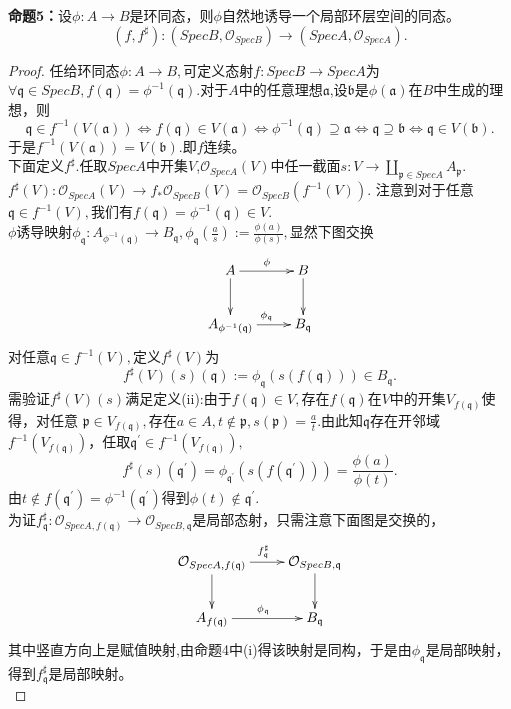 \documentclass[UTF8]{article}
\begin{document}
\textbf{命题5：}设$\phi:A\rightarrow B$是环同态，则$\phi$自然地诱导一个局部环层空间的同态。
$$
(f,f^{\sharp}):(SpecB,\mathcal{O}_{SpecB})\rightarrow (SpecA,\mathcal{O}_{SpecA}).
$$
\begin{proof}
	任给环同态$\phi :A\rightarrow B,$可定义态射$f:SpecB\rightarrow SpecA$为$\forall \mathfrak{q}\in SpecB,f(\mathfrak{q})=\phi^{-1}(\mathfrak{q})$.对于$A$中的任意理想$\mathfrak{a}$,设$\mathfrak{b}$是$\phi(\mathfrak{a})$在$B$中生成的理想，则$$
	\mathfrak{q}\in f^{-1}(V(\mathfrak{a}))\Longleftrightarrow f(\mathfrak{q})\in V(\mathfrak{a})\Longleftrightarrow \phi^{-1}(\mathfrak{q})\supseteq \mathfrak{a}\Longleftrightarrow \mathfrak{q}\supseteq \mathfrak{b}\Longleftrightarrow \mathfrak{q}\in V(\mathfrak{b}).
	$$
	于是$f^{-1}(V(\mathfrak{a}))=V(\mathfrak{b}).$即$f$连续。\\
	下面定义$f^{\sharp}.$任取$Spec{A}$中开集$V$,$\mathcal{O}_{SpecA}(V)$中任一截面$s:V\rightarrow \coprod_{\mathfrak{p}\in SpecA}A_{\mathfrak{p}}.$ $f^{\sharp}(V):\mathcal{O}_{SpecA}(V)\rightarrow f_{*}\mathcal{O}_{SpecB}(V)=\mathcal{O}_{SpecB}(f^{-1}(V)).$
	注意到对于任意$\mathfrak{q}\in f^{-1}(V),$我们有$f(\mathfrak{q})=\phi^{-1}(\mathfrak{q})\in V.$\\
	$\phi$诱导映射$\phi_{\mathfrak{q}}:A_{\phi^{-1}(\mathfrak{q})}\rightarrow B_{\mathfrak{q}},\phi_{\mathfrak{q}}(\frac{a}{s}):=\frac{\phi(a)}{\phi(s)},$显然下图交换
	$$
	\xymatrix{
	A\ar[r]^{\phi}\ar[d]&B\ar[d]\\
	A_{\phi^{-1}(\mathfrak{q})}\ar[r]^{\phi_{\mathfrak{q}}}&B_{\mathfrak{q}}
}
	$$
	对任意$\mathfrak{q}\in f^{-1}(V),$定义$f^{\sharp}(V)$为
	$$f^{\sharp}(V)(s)(\mathfrak{q}):=\phi_{\mathfrak{q}}(s(f(\mathfrak{q})))\in B_{\mathfrak{q}}.$$
需验证$f^{\sharp}(V)(s)$满足定义(ii):由于$f(\mathfrak{q})\in V,$存在$f(\mathfrak{q})$在$V$中的开集$V_{f(\mathfrak{q})}$使得，对任意
$\mathfrak{p}\in V_{f(\mathfrak{q})},$存在$a\in A,t\notin \mathfrak{p},s(\mathfrak{p})=\frac{a}{t}.$由此知$\mathfrak{q}$存在开邻域$f^{-1}(V_{f(\mathfrak{q})})$，任取$\mathfrak{q}^{'}\in f^{-1}(V_{f(\mathfrak{q})}),$
$$f^{\sharp}(s)(\mathfrak{q}^{'})=\phi_{\mathfrak{q}^{'}}(s(f(\mathfrak{q}^{'})))=\frac{\phi(a)}{\phi(t)}.$$
由$t\notin f(\mathfrak{q}^{'})=\phi^{-1}(\mathfrak{q}^{'})$得到$\phi(t)\notin \mathfrak{q}^{'}.$\\
为证$f^{\sharp}_{\mathfrak{q}}:\mathcal{O}_{SpecA,f(\mathfrak{q})}\rightarrow \mathcal{O}_{SpecB,\mathfrak{q}}$是局部态射，只需注意下面图是交换的，
$$
\xymatrix{
\mathcal{O}_{SpecA,f(\mathfrak{q})}\ar[r]^{f^{\sharp}_{\mathfrak{q}}}\ar[d]&\mathcal{O}_{SpecB,\mathfrak{q}}\ar[d]\\
	A_{f(\mathfrak{q})}\ar[r]^{\phi_{\mathfrak{q}}}&B_{\mathfrak{q}}
}
$$
其中竖直方向上是赋值映射,由命题4中(i)得该映射是同构，于是由$\phi_{\mathfrak{q}}$是局部映射，得到$f^{\sharp}_{\mathfrak{q}}$是局部映射。\\
\end{proof}
\end{document}
